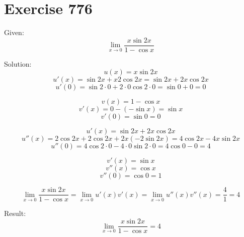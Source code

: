 \documentclass[a4paper, 10pt]{scrartcl}
\begin{document}
\section{Exercise 776}

Given:
\[
\lim_{x\to 0}{\frac{x\sin{2x}}{1 - \cos{x}}}
\]

Solution:
\[
u(x) = x\sin{2x}
\]
\[
u'(x) = \sin{2x} + x2\cos{2x} = \sin{2x} + 2x\cos{2x}
\]
\[
u'(0) = \sin{2\cdot 0} + 2\cdot 0\cos{2\cdot 0} = \sin{0} + 0 = 0
\]

\[
v(x) = 1 - \cos{x}
\]
\[
v'(x) = 0 - (-\sin{x}) = \sin{x}
\]
\[
v'(0) = \sin{0} = 0
\]

\[
u'(x) = \sin{2x} + 2x\cos{2x}
\]
\[
u''(x) = 2\cos{2x} + 2\cos{2x} + 2x(-2\sin{2x}) = 4\cos{2x} - 4x\sin{2x}
\]
\[
u''(0) = 4\cos{2\cdot 0} - 4\cdot 0\sin{2\cdot 0} = 4\cos{0} - 0 = 4
\]

\[
v'(x) = \sin{x}
\]
\[
v''(x) = \cos{x}
\]
\[
v''(0) = \cos{0} = 1
\]

\[
\lim_{x\to 0}{\frac{x\sin{2x}}{1 - \cos{x}}} = \lim_{x\to 0}{u'(x)}{v'(x)} = \lim_{x\to 0}{u''(x)}{v''(x)} = \frac{4}{1} = 4
\]

Result:
\[
\lim_{x\to 0}{\frac{x\sin{2x}}{1 - \cos{x}}} = 4
\]
\end{document}
